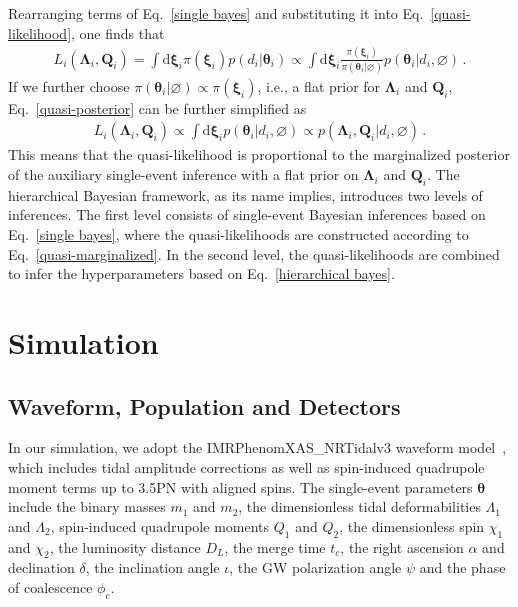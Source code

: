 \documentclass[a4paper,11pt]{article}
\begin{document}
Rearranging terms of Eq.~\eqref{single bayes} and substituting it into
Eq.~\eqref{quasi-likelihood}, one finds that
\begin{equation}
\label{quasi-posterior}
\begin{aligned}
    L_i(\bm{\Lambda}_i,\bm{Q}_i) = \int \text{d}\bm{\xi}_i \pi(\bm{\xi}_i)p(d_i|\bm{\theta}_i) \propto \int \text{d}\bm{\xi}_i \frac{\pi(\bm{\xi}_i)}{\pi(\bm{\theta}_i|\varnothing)}p(\bm{\theta}_i|d_i,\varnothing)\,.
\end{aligned}  
\end{equation}
If we further choose $\pi(\bm{\theta}_i|\varnothing)\propto\pi(\bm{\xi}_i)$, 
i.e., a flat prior for $\bm{\Lambda}_i$ and $\bm{Q}_i$, Eq.~\eqref{quasi-posterior} can be further simplified as 
\begin{equation}
\label{quasi-marginalized}
\begin{aligned}
    L_i(\bm{\Lambda}_i,\bm{Q}_i) \propto \int \text{d}\bm{\xi}_i p(\bm{\theta}_i|d_i,\varnothing)\propto p(\bm{\Lambda}_i,\bm{Q}_i|d_i,\varnothing)\,.
\end{aligned}  
\end{equation}
This means that the quasi-likelihood is proportional to the marginalized
posterior of the auxiliary single-event inference with a flat prior on
$\bm{\Lambda}_i$ and $\bm{Q}_i$. The
hierarchical Bayesian framework, as its name implies, introduces two levels of 
inferences. The first level 
consists of single-event Bayesian inferences based on Eq.~\eqref{single bayes},
where the quasi-likelihoods are constructed according to
Eq.~\eqref{quasi-marginalized}. In the second level, the quasi-likelihoods are
combined to infer the hyperparameters based on Eq.~\eqref{hierarchical bayes}.


\section{Simulation}
\label{sec:simulation}

\subsection{Waveform, Population and Detectors}
\label{subsec:simulation_preliminaries}

In our simulation, we adopt the {\sc IMRPhenomXAS\_NRTidalv3} waveform model~\cite{Abac:2023ujg}, 
which includes tidal amplitude corrections as well as spin-induced quadrupole
moment terms up to 3.5PN with aligned spins.
The single-event parameters $\bm{\theta}$ include 
 the binary masses $m_1$ and $m_2$, the 
dimensionless tidal deformabilities $\Lambda_1$ and $\Lambda_2$, spin-induced 
quadrupole moments $Q_1$ and $Q_2$, the dimensionless spin $\chi_1$ and $\chi_2$, the 
luminosity distance $D_L$, the merge time $t_{c}$, the right ascension $\alpha$ and 
declination $\delta$, the inclination angle $\iota$, the GW polarization angle 
$\psi$ and the phase of coalescence $\phi_{c}$.
\end{document}
